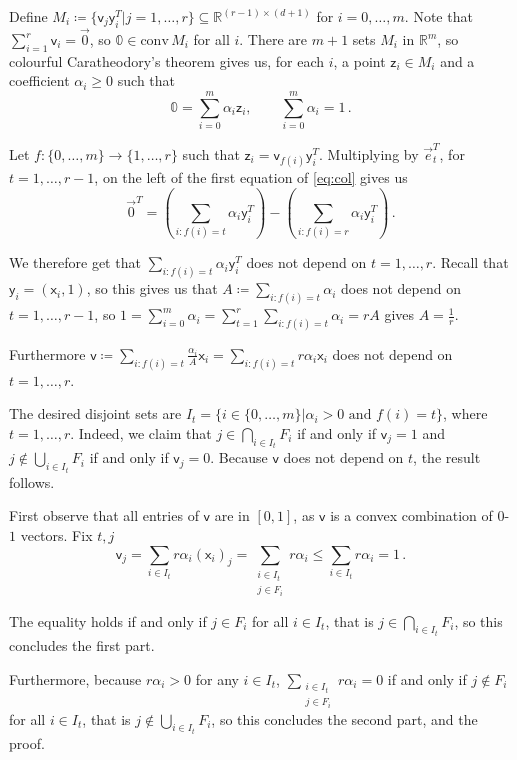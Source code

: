 \documentclass[kulak]{tplt}
\theoremstyle{definition}
\newcommand{\R}{\mathbb{R}}
\newcommand{\vv}{\mathsf{v}}
\newcommand{\vx}{\mathsf{x}}
\newcommand{\vy}{\mathsf{y}}
\newcommand{\vz}{\mathsf{z}}
\newcommand{\conv}{\mathrm{conv}}
\begin{document}
\begin{enumerate}
Define $M_i \coloneqq \{\vv_j\vy^T_i | j=1, \ldots, r \} \subseteq \R^{(r-1) \times (d+1)}$ for $i = 0, \ldots, m$.
Note that $\sum_{i=1}^r \vv_i = \vec{0}$, so $\mathbb{0} \in \conv \, M_i$ for all $i$.
There are $m+1$ sets $M_i$ in $\R^m$, so colourful Caratheodory's theorem gives us, for each $i$, a point $\vz_i\in M_i$ and a coefficient $\alpha_i\geq 0$ such that 
\begin{equation}\label{eq:col}
 \mathbb{0} = \sum_{i=0}^m \alpha_i \vz_i , \quad \quad \sum_{i=0}^m \alpha_i = 1\, . 
\end{equation}

Let $f:\{0, \ldots, m\} \to \{1, \ldots, r\}$ such that $\vz_i = \vv_{f(i)}\vy_i^T$.
Multiplying by $\vec{e}_t^T$, for $t = 1, \ldots, r-1$, on the left of the first equation of \eqref{eq:col} gives us 
$$ \vec{0}^T = \left( \sum_{i: f(i) = t} \alpha_i \vy_i^T\right) - \left(\sum_{i: f(i) = r} \alpha_i \vy_i^T \right) \, . $$

We therefore get that $ \sum_{i: f(i) = t} \alpha_i \vy_i^T$ does not depend on $t = 1, \ldots, r$.
Recall that $\vy_i = (\vx_i, 1)$, so this gives us that $A \coloneqq  \sum_{i: f(i) = t} \alpha_i$ does not depend on $t = 1, \ldots, r-1$, so $1 = \sum_{i=0}^m \alpha_i = \sum_{t=1}^r \sum_{i: f(i) = t} \alpha_i = r A$ gives $A = \frac{1}{r}$.

Furthermore $\vv \coloneqq  \sum_{i: f(i) = t} \frac{\alpha_i}{A}\vx_i = \sum_{i: f(i) = t} r \alpha_i\vx_i$ does not depend on $t=1, \ldots, r$.

The desired disjoint sets are $I_t = \{ i \in \{0, \ldots, m\} | \alpha_i > 0 \text{ and } f(i) = t \}$, where $t = 1, \ldots, r$.
Indeed, we claim that $j \in \bigcap_{i \in I_t} F_i$ if and only if $\vv_j = 1$ and $j \not\in \bigcup_{i \in I_t} F_i$ if and only if $\vv_j = 0$.
Because $\vv $ does not depend on $t$, the result follows.

First observe that all entries of $\vv$ are in $[0, 1]$, as $\vv$ is a convex combination of $0$-$1$ vectors.
Fix $t, j$
$$\vv_j = \sum_{i \in I_t} r \alpha_i(\vx_i)_j = \sum_{\substack{i \in I_t\\ j \in F_i}} r \alpha_i \leq \sum_{i \in I_t} r \alpha_i = 1  \, .$$

The equality holds if and only if $j \in F_i$ for all $i\in I_t$, that is $j \in \bigcap_{i \in I_t} F_i$, so this concludes the first part.

Furthermore, because $r \alpha_i > 0$ for any $i\in I_t$, $\sum_{\substack{i \in I_t\\ j \in F_i}} r \alpha_i  = 0 $ if and only if $j \not\in F_i$ for all $i\in I_t$, that is $j \not\in \bigcup_{i \in I_t} F_i$, so this concludes the second part, and the proof.
\end{enumerate}
\end{document}
